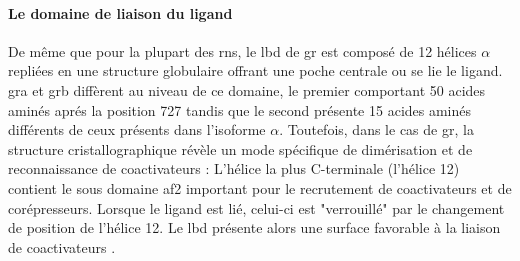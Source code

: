 \documentclass[../main.tex]{subfiles}
\begin{document}
		\paragraph{Le domaine de liaison du ligand}
			De même que pour la plupart des \glspl{rn}, le \gls{lbd} de \gls{gr} est composé de 12 hélices $\alpha$ repliées en une structure globulaire offrant une poche centrale ou se lie le ligand.
			\gls{gra} et \gls{grb} diffèrent au niveau de ce domaine, le premier comportant 50 acides aminés aprés la position 727 tandis que le second présente 15 acides aminés différents de ceux présents dans l'isoforme $\alpha$.
			Toutefois, dans le cas de \gls{gr}, la structure cristallographique révèle un mode spécifique de dimérisation et de reconnaissance de coactivateurs \citep{Bledsoe2002}:
			L'hélice la plus C-terminale (l'hélice 12) contient le sous domaine \gls{af2} important pour le recrutement de coactivateurs et de corépresseurs.
			Lorsque le ligand est lié, celui-ci est "verrouillé" par le changement de position de l'hélice 12.
			Le \gls{lbd} présente alors une surface favorable à la liaison de coactivateurs \citep{Bledsoe2002}.

\end{document}
